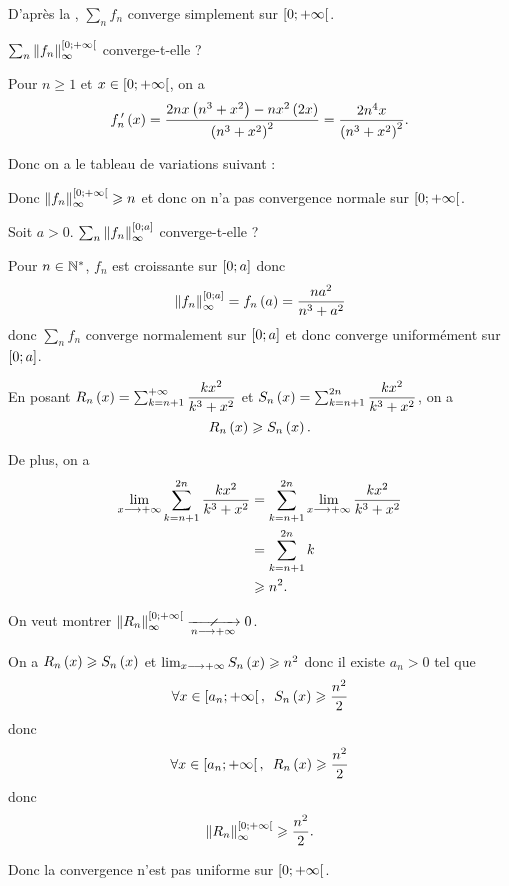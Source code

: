 \begin{corr}
D'après la , \(\sum_nf_n\) converge simplement sur \(\left[0;+\infty\right[\).

\(\sum_n\norme{f_n}_\infty^{\intervie{0}{\pinf}}\) converge-t-elle ?

Pour \(n\geq1\) et \(x\in\left[0;+\infty\right[\), on a \[f_n^{\,\prime}\left(x\right)=\dfrac{2nx\left(n^3+x^2\right)-nx^2\left(2x\right)}{\left(n^3+x^2\right)^2}=\dfrac{2n^4x}{\left(n^3+x^2\right)^2}.\]

Donc on a le tableau de variations suivant :

\begin{center}
\end{center}

Donc \(\norme{f_n}_\infty^{\intervie{0}{\pinf}}\geq n\) et donc on n'a pas convergence normale sur \(\left[0;+\infty\right[\).

Soit \(a>0\). \(\sum_n\norme{f_n}_\infty^{\intervii{0}{a}}\) converge-t-elle ?

Pour \(n\in\mathbb{N}^*\), \(f_n\) est croissante sur \(\left[0;a\right]\) donc \[\norme{f_n}_\infty^{\intervii{0}{a}}=f_n\paren{a}=\dfrac{na^2}{n^3+a^2}\] donc \(\sum_nf_n\) converge normalement sur \(\left[0;a\right]\) et donc converge uniformément sur \(\left[0;a\right]\).

En posant \(R_n\left(x\right)=\sum_{k=n+1}^{+\infty}\dfrac{kx^2}{k^3+x^2}\) et \(S_n\left(x\right)=\sum_{k=n+1}^{2n}\dfrac{kx^2}{k^3+x^2}\), on a \[R_n\left(x\right)\geqslant S_n\left(x\right).\]

De plus, on a \[\begin{aligned}
\lim_{x\longrightarrow+\infty}\sum_{k=n+1}^{2n}\dfrac{kx^2}{k^3+x^2}&=\sum_{k=n+1}^{2n}\lim_{x\longrightarrow+\infty}\dfrac{kx^2}{k^3+x^2} \\
&=\sum_{k=n+1}^{2n}k \\
&\geqslant n^2.
\end{aligned}\]

On veut montrer \(\norme{R_n}_\infty^{\intervie{0}{\pinf}}\ntendqd{n\to\pinf}0\).

On a \(R_n\left(x\right)\geqslant S_n\left(x\right)\) et \(\lim_{x\longrightarrow+\infty}S_n\left(x\right)\geqslant n^2\) donc il existe \(a_n>0\) tel que \[\quantifs{\forall x\in\intervie{a_n}{\pinf}}S_n\paren{x}\geq\dfrac{n^2}{2}\] donc \[\quantifs{\forall x\in\intervie{a_n}{\pinf}}R_n\paren{x}\geq\dfrac{n^2}{2}\] donc \[\norme{R_n}_\infty^{\intervie{0}{\pinf}}\geq\dfrac{n^2}{2}.\]

Donc la convergence n'est pas uniforme sur \(\left[0;+\infty\right[\).
\end{corr}


